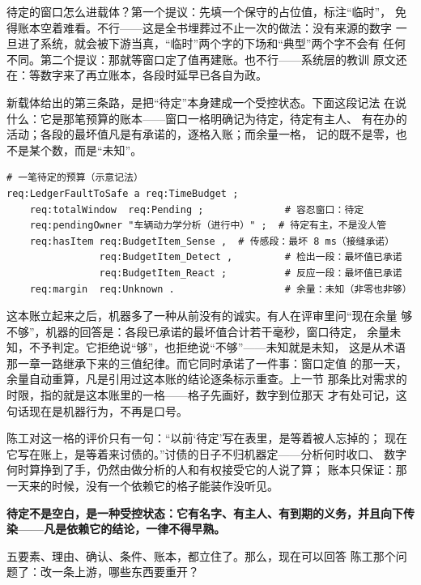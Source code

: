 待定的窗口怎么进载体？第一个提议：先填一个保守的占位值，标注“临时”，
免得账本空着难看。不行——这是全书埋葬过不止一次的做法：没有来源的数字
一旦进了系统，就会被下游当真，“临时”两个字的下场和“典型”两个字不会有
任何不同。第二个提议：那就等窗口定了值再建账。也不行——系统层的教训
原文还在：等数字来了再立账本，各段时延早已各自为政。

新载体给出的第三条路，是把“待定”本身建成一个受控状态。下面这段记法
在说什么：它是那笔预算的账本——窗口一格明确记为待定，待定有主人、
有在办的活动；各段的最坏值凡是有承诺的，逐格入账；而余量一格，
记的既不是零，也不是某个数，而是“未知”。

\nopagebreak[4]
\begin{codebox}
\begin{Verbatim}[fontsize=\small,breaklines=true,breakanywhere=true,breaksymbolleft={},breaksymbolright={}]
# 一笔待定的预算（示意记法）
req:LedgerFaultToSafe a req:TimeBudget ;
    req:totalWindow  req:Pending ;              # 容忍窗口：待定
    req:pendingOwner "车辆动力学分析（进行中）" ;  # 待定有主，不是没人管
    req:hasItem req:BudgetItem_Sense ,  # 传感段：最坏 8 ms（接缝承诺）
                req:BudgetItem_Detect ,         # 检出一段：最坏值已承诺
                req:BudgetItem_React ;          # 反应一段：最坏值已承诺
    req:margin  req:Unknown .                   # 余量：未知（非零也非够）
\end{Verbatim}
\end{codebox}

这本账立起来之后，机器多了一种从前没有的诚实。有人在评审里问“现在余量
够不够”，机器的回答是：各段已承诺的最坏值合计若干毫秒，窗口待定，
余量未知，不予判定。它拒绝说“够”，也拒绝说“不够”——未知就是未知，
这是从术语那一章一路继承下来的三值纪律。而它同时承诺了一件事：窗口定值
的那一天，余量自动重算，凡是引用过这本账的结论逐条标示重查。上一节
那条比对需求的时限，指的就是这本账里的一格——格子先画好，数字到位那天
才有处可记，这句话现在是机器行为，不再是口号。

陈工对这一格的评价只有一句：“以前‘待定’写在表里，是等着被人忘掉的；
现在它写在账上，是等着来讨债的。”讨债的日子不归机器定——分析何时收口、
数字何时算挣到了手，仍然由做分析的人和有权接受它的人说了算；
账本只保证：那一天来的时候，没有一个依赖它的格子能装作没听见。

\textbf{待定不是空白，是一种受控状态：它有名字、有主人、有到期的义务，并且向下传染——凡是依赖它的结论，一律不得早熟。}

五要素、理由、确认、条件、账本，都立住了。那么，现在可以回答
陈工那个问题了：改一条上游，哪些东西要重开？

